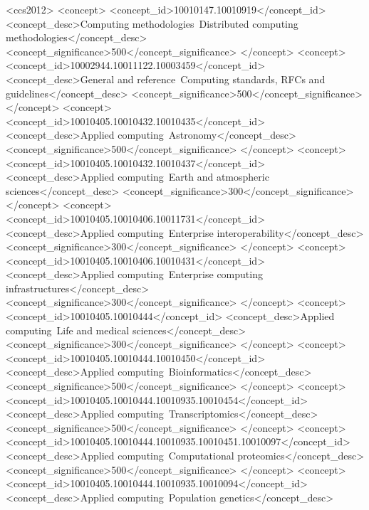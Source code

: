 \documentclass[sigconf,authordraft]{acmart}
\begin{document}
\begin{CCSXML}
<ccs2012>
   <concept>
       <concept_id>10010147.10010919</concept_id>
       <concept_desc>Computing methodologies~Distributed computing methodologies</concept_desc>
       <concept_significance>500</concept_significance>
       </concept>
   <concept>
       <concept_id>10002944.10011122.10003459</concept_id>
       <concept_desc>General and reference~Computing standards, RFCs and guidelines</concept_desc>
       <concept_significance>500</concept_significance>
       </concept>
   <concept>
       <concept_id>10010405.10010432.10010435</concept_id>
       <concept_desc>Applied computing~Astronomy</concept_desc>
       <concept_significance>500</concept_significance>
       </concept>
   <concept>
       <concept_id>10010405.10010432.10010437</concept_id>
       <concept_desc>Applied computing~Earth and atmospheric sciences</concept_desc>
       <concept_significance>300</concept_significance>
       </concept>
   <concept>
       <concept_id>10010405.10010406.10011731</concept_id>
       <concept_desc>Applied computing~Enterprise interoperability</concept_desc>
       <concept_significance>300</concept_significance>
       </concept>
   <concept>
       <concept_id>10010405.10010406.10010431</concept_id>
       <concept_desc>Applied computing~Enterprise computing infrastructures</concept_desc>
       <concept_significance>300</concept_significance>
       </concept>
   <concept>
       <concept_id>10010405.10010444</concept_id>
       <concept_desc>Applied computing~Life and medical sciences</concept_desc>
       <concept_significance>300</concept_significance>
       </concept>
   <concept>
       <concept_id>10010405.10010444.10010450</concept_id>
       <concept_desc>Applied computing~Bioinformatics</concept_desc>
       <concept_significance>500</concept_significance>
       </concept>
   <concept>
       <concept_id>10010405.10010444.10010935.10010454</concept_id>
       <concept_desc>Applied computing~Transcriptomics</concept_desc>
       <concept_significance>500</concept_significance>
       </concept>
   <concept>
       <concept_id>10010405.10010444.10010935.10010451.10010097</concept_id>
       <concept_desc>Applied computing~Computational proteomics</concept_desc>
       <concept_significance>500</concept_significance>
       </concept>
   <concept>
       <concept_id>10010405.10010444.10010935.10010094</concept_id>
       <concept_desc>Applied computing~Population genetics</concept_desc>

\end{CCSXML}
\end{document}
